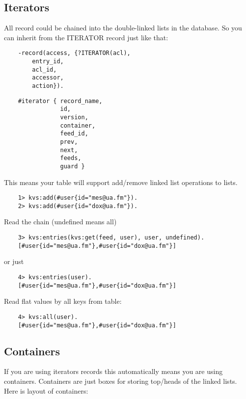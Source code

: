 \newpage
\subsection{Iterators}

All record could be chained into the double-linked lists in the database.
So you can inherit from the ITERATOR record just like that:

\begin{lstlisting}
    -record(access, {?ITERATOR(acl),
        entry_id,
        acl_id,
        accessor,
        action}).
\end{lstlisting}

\begin{lstlisting}
    #iterator { record_name,
                id,
                version,
                container,
                feed_id,
                prev,
                next,
                feeds,
                guard }
\end{lstlisting}

This means your table will support add/remove linked list operations to lists.

\begin{lstlisting}
    1> kvs:add(#user{id="mes@ua.fm"}).
    2> kvs:add(#user{id="dox@ua.fm"}).
\end{lstlisting}

Read the chain (undefined means all)

\begin{lstlisting}
    3> kvs:entries(kvs:get(feed, user), user, undefined).
    [#user{id="mes@ua.fm"},#user{id="dox@ua.fm"}]
\end{lstlisting}

or just

\begin{lstlisting}
    4> kvs:entries(user).
    [#user{id="mes@ua.fm"},#user{id="dox@ua.fm"}]
\end{lstlisting}

Read flat values by all keys from table:

\begin{lstlisting}
    4> kvs:all(user).
    [#user{id="mes@ua.fm"},#user{id="dox@ua.fm"}]
\end{lstlisting}

\subsection{Containers}

If you are using iterators records this automatically
means you are using containers. Containers are just boxes
for storing top/heads of the linked lists. Here is layout
of containers:

